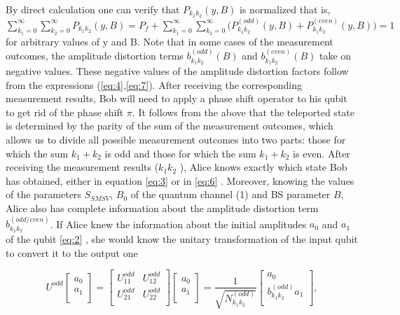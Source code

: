 \documentclass{optica-article}
\begin{document}
By direct calculation one can verify that $P_{k_1 k_2} (y,B)$ is normalized that is, $\sum_{k_1=0}^{\infty}\sum_{k_2=0}^{\infty}P_{k_1k_2}(y,B) = P_f + \sum_{k_1=0}^{\infty}\sum_{k_2=0}^{\infty}\Big(P^{(odd)}_{k_1k_2}(y,B) + P^{(even)}_{k_1k_2}(y,B)\Big)=1$ for arbitrary values of y and B. 
Note that in some cases of the measurement outcomes, the amplitude distortion terms $b_{k_1 k_2}^{(odd)}(B)$ and $b_{k_1 k_2}^{(even)}(B)$ take on negative values. These negative values of the amplitude distortion factors follow from the expressions (\ref{eq:4},\ref{eq:7}). After receiving the corresponding measurement results, Bob will need to apply a phase shift operator to his qubit to get rid of the phase shift $\pi$.  
It follows from the above that the teleported state is determined by the parity of the sum of the measurement outcomes, which allows us to divide all possible measurement outcomes into two parts: those for which the sum $k_1+k_2$ is odd and those for which the sum $k_1+k_2$ is even. After receiving the measurement results ($k_1 k_2$ ), Alice knows exactly which state Bob has obtained, either in equation \eqref{eq:3}  or in \eqref{eq:6} . Moreover, knowing the values of the parameters $S_{SMSV}$, $B_0$ of the quantum channel (1) and BS parameter $B$, Alice also has complete information about the amplitude distortion term $b_{k_1 k_2}^{(odd/even)}$. If Alice knew the information about the initial amplitudes $a_0$ and $a_1$ of the qubit \eqref{eq:2} , she would know the unitary transformation of the input qubit to convert it to the output one

\begin{equation}\label{eq:10}
U^{odd}\begin{bmatrix}
        a_0 \\
        a_1 \\
      \end{bmatrix} = 
      \begin{bmatrix}
        U^{odd}_{11} & U^{odd}_{12}  \\
        U^{odd}_{21} & U^{odd}_{22}  \\
      \end{bmatrix}
      \begin{bmatrix}
        a_0 \\
        a_1 \\
      \end{bmatrix} = 
      \frac{1}{\sqrt{N^{(odd)}_{k_1k_2}}}
        \begin{bmatrix}
        a_0 \\
        b^{(odd)}_{k_1k_2}a_1 \\
      \end{bmatrix},      
\end{equation}
\end{document}
